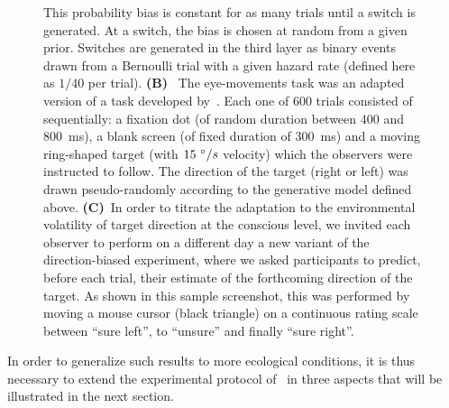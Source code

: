 \documentclass[12pt,english]{article}%
\newcommand{\ms}{\si{\milli\second}}%
\newcommand{\citet}[1]{\textcite{#1}}
\begin{document}
\begin{figure}
{This probability bias is constant for as many trials until a switch is generated. 
At a switch, the bias is chosen at random from a given prior.
Switches are generated in the third layer as binary events drawn from a Bernoulli trial
with a given hazard rate (defined here as $1/40$ per trial).
\textbf{(B)}~
The eye-movements task was an adapted version of a task developed by~\citet{Montagnini2010}.
Each one of $600$ trials consisted of sequentially:
a fixation dot (of random duration between $400$ and $800$~\ms),
a blank screen (of fixed duration of  $300$~\ms) and
a moving ring-shaped target (with $15~\degree/s$ velocity) which the observers were instructed to follow.
The direction of the target (right or left) was drawn pseudo-randomly
according to the generative model defined above.
\textbf{(C)}~In order to titrate the adaptation
to the environmental volatility of target direction at the conscious level,
we invited each observer to perform on a different day a new variant of the direction-biased experiment,
where we asked participants to predict, before each trial, %
their estimate of the forthcoming direction of the target.
As shown in this sample screenshot,
this was performed by moving a mouse cursor (black triangle) on a continuous rating scale
between ``sure left'', to ``unsure'' and finally ``sure right''.
}
\label{fig:intro}
\end{figure}
In order to generalize such results to more ecological conditions,
it is thus necessary to extend the experimental protocol of~\citet{Montagnini2010} in three aspects that will be illustrated in the next section.
\end{document}
